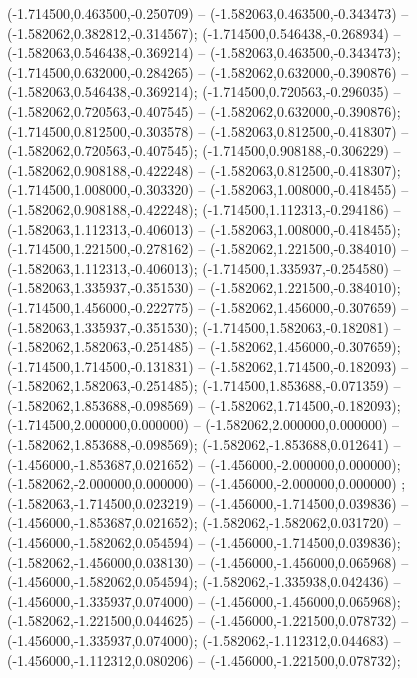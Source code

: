  (-1.714500,0.463500,-0.250709) -- (-1.582063,0.463500,-0.343473) -- (-1.582062,0.382812,-0.314567);
 (-1.714500,0.546438,-0.268934) -- (-1.582063,0.546438,-0.369214) -- (-1.582063,0.463500,-0.343473);
 (-1.714500,0.632000,-0.284265) -- (-1.582062,0.632000,-0.390876) -- (-1.582063,0.546438,-0.369214);
 (-1.714500,0.720563,-0.296035) -- (-1.582062,0.720563,-0.407545) -- (-1.582062,0.632000,-0.390876);
 (-1.714500,0.812500,-0.303578) -- (-1.582063,0.812500,-0.418307) -- (-1.582062,0.720563,-0.407545);
 (-1.714500,0.908188,-0.306229) -- (-1.582062,0.908188,-0.422248) -- (-1.582063,0.812500,-0.418307);
 (-1.714500,1.008000,-0.303320) -- (-1.582063,1.008000,-0.418455) -- (-1.582062,0.908188,-0.422248);
 (-1.714500,1.112313,-0.294186) -- (-1.582063,1.112313,-0.406013) -- (-1.582063,1.008000,-0.418455);
 (-1.714500,1.221500,-0.278162) -- (-1.582062,1.221500,-0.384010) -- (-1.582063,1.112313,-0.406013);
 (-1.714500,1.335937,-0.254580) -- (-1.582063,1.335937,-0.351530) -- (-1.582062,1.221500,-0.384010);
 (-1.714500,1.456000,-0.222775) -- (-1.582062,1.456000,-0.307659) -- (-1.582063,1.335937,-0.351530);
 (-1.714500,1.582063,-0.182081) -- (-1.582062,1.582063,-0.251485) -- (-1.582062,1.456000,-0.307659);
 (-1.714500,1.714500,-0.131831) -- (-1.582062,1.714500,-0.182093) -- (-1.582062,1.582063,-0.251485);
 (-1.714500,1.853688,-0.071359) -- (-1.582062,1.853688,-0.098569) -- (-1.582062,1.714500,-0.182093);
 (-1.714500,2.000000,0.000000) -- (-1.582062,2.000000,0.000000) -- (-1.582062,1.853688,-0.098569);
 (-1.582062,-1.853688,0.012641) -- (-1.456000,-1.853687,0.021652) -- (-1.456000,-2.000000,0.000000);
 (-1.582062,-2.000000,0.000000) -- (-1.456000,-2.000000,0.000000) ;
 (-1.582063,-1.714500,0.023219) -- (-1.456000,-1.714500,0.039836) -- (-1.456000,-1.853687,0.021652);
 (-1.582062,-1.582062,0.031720) -- (-1.456000,-1.582062,0.054594) -- (-1.456000,-1.714500,0.039836);
 (-1.582062,-1.456000,0.038130) -- (-1.456000,-1.456000,0.065968) -- (-1.456000,-1.582062,0.054594);
 (-1.582062,-1.335938,0.042436) -- (-1.456000,-1.335937,0.074000) -- (-1.456000,-1.456000,0.065968);
 (-1.582062,-1.221500,0.044625) -- (-1.456000,-1.221500,0.078732) -- (-1.456000,-1.335937,0.074000);
 (-1.582062,-1.112312,0.044683) -- (-1.456000,-1.112312,0.080206) -- (-1.456000,-1.221500,0.078732);
